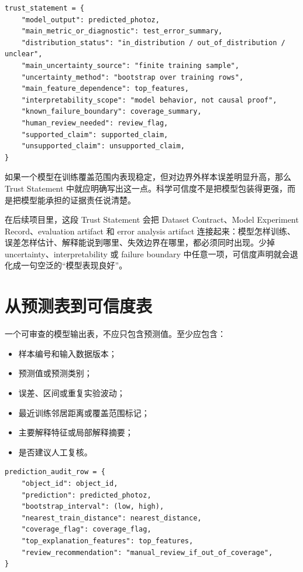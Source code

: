 \begin{examplebox}[可信度声明的最小骨架]
\begin{lstlisting}[style=pythonstyle]
trust_statement = {
    "model_output": predicted_photoz,
    "main_metric_or_diagnostic": test_error_summary,
    "distribution_status": "in_distribution / out_of_distribution / unclear",
    "main_uncertainty_source": "finite training sample",
    "uncertainty_method": "bootstrap over training rows",
    "main_feature_dependence": top_features,
    "interpretability_scope": "model behavior, not causal proof",
    "known_failure_boundary": coverage_summary,
    "human_review_needed": review_flag,
    "supported_claim": supported_claim,
    "unsupported_claim": unsupported_claim,
}
\end{lstlisting}
\end{examplebox}

如果一个模型在训练覆盖范围内表现稳定，但对边界外样本误差明显升高，那么 Trust Statement 中就应明确写出这一点。科学可信度不是把模型包装得更强，而是把模型能承担的证据责任说清楚。

在后续项目里，这段 Trust Statement 会把 Dataset Contract、Model Experiment Record、evaluation artifact 和 error analysis artifact 连接起来：模型怎样训练、误差怎样估计、解释能说到哪里、失效边界在哪里，都必须同时出现。少掉 uncertainty、interpretability 或 failure boundary 中任意一项，可信度声明就会退化成一句空泛的“模型表现良好”。

\section{从预测表到可信度表}

一个可审查的模型输出表，不应只包含预测值。至少应包含：

\begin{itemize}
    \item 样本编号和输入数据版本；
    \item 预测值或预测类别；
    \item 误差、区间或重复实验波动；
    \item 最近训练邻居距离或覆盖范围标记；
    \item 主要解释特征或局部解释摘要；
    \item 是否建议人工复核。
\end{itemize}

\begin{examplebox}[可信度表字段]
\begin{lstlisting}[style=pythonstyle]
prediction_audit_row = {
    "object_id": object_id,
    "prediction": predicted_photoz,
    "bootstrap_interval": (low, high),
    "nearest_train_distance": nearest_distance,
    "coverage_flag": coverage_flag,
    "top_explanation_features": top_features,
    "review_recommendation": "manual_review_if_out_of_coverage",
}
\end{lstlisting}
\end{examplebox}

